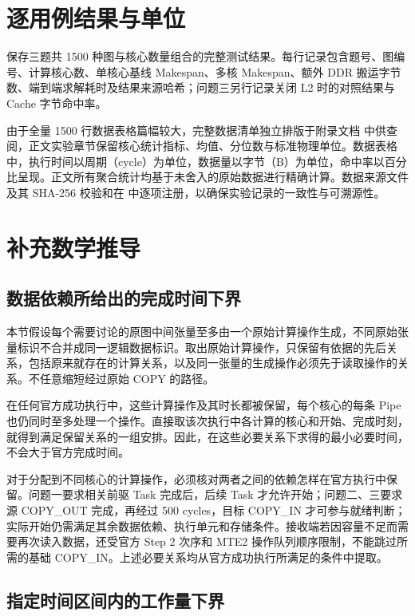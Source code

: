 \documentclass[anonymous,notoc]{gmcm2026}
\begin{document}
\section{逐用例结果与单位}

\texttt{} 保存三题共 1500 种图与核心数量组合的完整测试结果。每行记录包含题号、图编号、计算核心数、单核心基线 Makespan、多核 Makespan、额外 DDR 搬运字节数、端到端求解耗时及结果来源哈希；问题三另行记录关闭 L2 时的对照结果与 Cache 字节命中率。

由于全量 1500 行数据表格篇幅较大，完整数据清单独立排版于附录文档 \texttt{} 中供查阅，正文实验章节保留核心统计指标、均值、分位数与标准物理单位。数据表格中，执行时间以周期（cycle）为单位，数据量以字节（B）为单位，命中率以百分比呈现。正文所有聚合统计均基于未舍入的原始数据进行精确计算。数据来源文件及其 SHA-256 校验和在 \texttt{} 中逐项注册，以确保实验记录的一致性与可溯源性。

\section{补充数学推导}

\subsection{数据依赖所给出的完成时间下界}

本节假设每个需要讨论的原图中间张量至多由一个原始计算操作生成，不同原始张量标识不合并成同一逻辑数据标识。取出原始计算操作，只保留有依据的先后关系，包括原来就存在的计算关系，以及同一张量的生成操作必须先于读取操作的关系。不任意缩短经过原始 COPY 的路径。

在任何官方成功执行中，这些计算操作及其时长都被保留，每个核心的每条 Pipe 也仍同时至多处理一个操作。直接取该次执行中各计算的核心和开始、完成时刻，就得到满足保留关系的一组安排。因此，在这些必要关系下求得的最小必要时间，不会大于官方完成时间。

对于分配到不同核心的计算操作，必须核对两者之间的依赖怎样在官方执行中保留。问题一要求相关前驱 Task 完成后，后续 Task 才允许开始；问题二、三要求源 COPY\_OUT 完成，再经过 500 cycles，目标 COPY\_IN 才可参与就绪判断；实际开始仍需满足其余数据依赖、执行单元和存储条件。接收端若因容量不足而需要再次读入数据，还受官方 Step 2 次序和 MTE2 操作队列顺序限制，不能跳过所需的基础 COPY\_IN。上述必要关系均从官方成功执行所满足的条件中提取。

\subsection{指定时间区间内的工作量下界}
\end{document}
